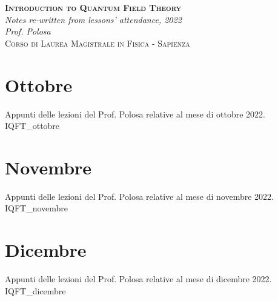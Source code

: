 \documentclass[10pt,a4paper]{report}
\begin{document}
\begin{titlepage}
	\centering
	\vspace*{50mm}
	\huge \textbf{\textsc{Introduction to Quantum Field Theory}} \\
	\vspace*{3mm}
	\Large \textit{Notes re-written from lessons' attendance, 2022} \\
	\Large \textit{Prof. Polosa} \\
	\vspace*{4mm}
	\Large \textsc{Corso di Laurea Magistrale in Fisica - Sapienza}
\end{titlepage}
\restoregeometry


\FloatBarrier
\chapter{Ottobre}
Appunti delle lezioni del Prof. Polosa relative al mese di ottobre 2022.
{IQFT_ottobre}

\FloatBarrier
\chapter{Novembre}
Appunti delle lezioni del Prof. Polosa relative al mese di novembre 2022.
{IQFT_novembre}

\FloatBarrier
\chapter{Dicembre}
Appunti delle lezioni del Prof. Polosa relative al mese di dicembre 2022.
{IQFT_dicembre}
\end{document}
